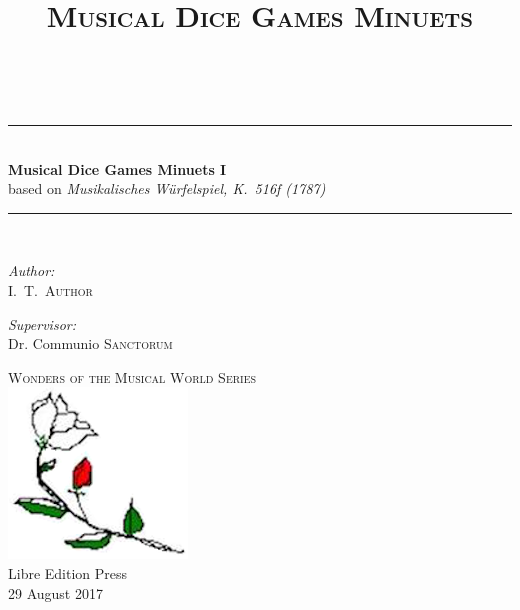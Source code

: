 \documentclass[letterpaper,x11names,svgnames,10pt]{article}
\title{\textsc{Musical Dice Games Minuets \volNumber}}
\author{\textsc{\authorFirstMidNameInit \authorLastName}}
\date{\textsc{\dateGenerated}}
\def\authorFirstMidNameInit{I.\ T.\ }
\def\authorLastName{Author}
\def\dateGenerated{29 August 2017}
\def\volNumber{I}
\newcommand{\HRule}{\rule{\linewidth}{0.5mm}}
\begin{document}


\newpage
{
	${}_{}$\\
	\vspace{1.00in}	
	\thispagestyle{empty}
	\begin{center}
		\HRule \\[0.4cm]
		{ \huge \bfseries Musical Dice Games Minuets \volNumber} \\[0.2cm]
		{\large based on {\em Musikalisches W\"{u}rfelspiel, K.\ 516f (1787)} }\\[0.2cm]
		\HRule \\[1.5cm]
		\begin{minipage}{0.4\textwidth}
			\begin{flushleft} \large
				\emph{Author:}\\
				\authorFirstMidNameInit \textsc{\authorLastName}
			\end{flushleft}
		\end{minipage}
		\begin{minipage}{0.4\textwidth}
			\begin{flushright} \large
				\emph{Supervisor:} \\
				Dr. Communio \textsc{Sanctorum}
			\end{flushright}
		\end{minipage}
		\vfill
		{\textsc{\Large Wonders of the Musical World Series}}  \\[0.2cm] 
		\includegraphics*[width=0.15\linewidth]{1.png}\\ 
		{\large Libre Edition Press \\
		         \dateGenerated }\\
		\vspace{2.50in}
	\end{center}
	\newpage
	
	
	\tableofcontents\label{tabofcon}
	

}
\end{document}
